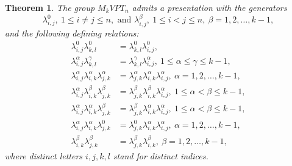 \documentclass[preprint]{elsarticle}
\newtheorem{theorem}{Theorem}[section]
\begin{document}
\begin{theorem}
    The group $M_kVPT_n$ admits a presentation with the generators \[\lambda_{i,j}^0,~ 1\leq i \neq j \leq n, \text{ and } \lambda_{i,j}^{\beta},~ 1\leq i < j \leq n, \  \beta=1,2,\ldots, k-1,\]
    and the following defining relations: 
    \begin{align}
        \lambda_{i,j}^{0} \lambda_{k,l}^{0} &= \lambda_{k,l}^{0} \lambda_{i,j}^{0},\\
        \lambda_{i,j}^{\alpha} \lambda_{k,l}^{\gamma} &= \lambda_{k,l}^{\gamma} \lambda_{i,j}^{\alpha},~1 \leq \alpha \leq \gamma \leq k-1,\\
        \lambda_{i,j}^{\alpha} \lambda_{i,k}^{\alpha} \lambda_{j,k}^{\alpha} &= \lambda_{j,k}^{\alpha} \lambda_{i,k}^{\alpha} \lambda_{i,j}^{\alpha},~ \alpha=1,2,\ldots ,k-1,\\ %
         \lambda_{i,j}^{\alpha} \lambda_{i,k}^{\beta} \lambda_{j,k}^{\beta} &= \lambda_{j,k}^{\beta} \lambda_{i,k}^{\beta} \lambda_{i,j}^{\alpha},~1 \leq \alpha < \beta \leq k-1,\\
          \lambda_{i,j}^{\alpha} \lambda_{i,k}^{\alpha} \lambda_{j,k}^{\beta} &= \lambda_{j,k}^{\beta} \lambda_{i,k}^{\alpha} \lambda_{i,j}^{\alpha},~ 1\leq  \alpha < \beta \leq k-1,\\
           \lambda_{i,j}^{\alpha} \lambda_{i,k}^{\alpha} \lambda_{j,k}^{0} &= \lambda_{j,k}^{0} \lambda_{i,k}^{\alpha} \lambda_{i,j}^{\alpha},  \ \alpha=1,2,\ldots ,k-1,\\
          \lambda_{i,k}^{\beta} \lambda_{j,k}^{\beta} &= \lambda_{j,k}^{\beta} \lambda_{i,k}^{\beta}, \ \beta=1,2,\ldots ,k-1,
          \end{align}
    where distinct letters $i,j,k,l$ stand for distinct indices.
\end{theorem}
\end{document}
